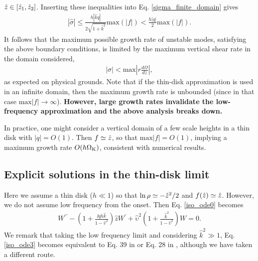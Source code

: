 $\hat{z}\in[\hat{z}_1,\hat{z}_2]$. Inserting these inequalities into
Eq. \ref{sigma_finite_domain} gives
\begin{align}\label{max_growth}
  |\hat{\sigma}|\leq
  \frac{h |\hat{k} q|}{2\sqrt{1+\hat{k}^2}}\mathrm{max}(|f|) < \frac{h |q|}{2}\mathrm{max}(|f|) . 
\end{align}
It
follows that the maximum possible growth rate of unstable modes,
satisfying the above boundary conditions, is limited by the maximum
vertical shear rate in the domain considered,
\begin{align}
  |\sigma| < \mathrm{max} \left|r\frac{d\Omega}{dz}\right|, 
\end{align}
as expected on physical grounds. Note that if the thin-disk
approximation is used in an infinite domain, then the maximum growth
rate is unbounded (since in that case $\mathrm{max}|f|\to\infty$).
{\bf However, large growth rates invalidate the low-frequency
  approximation and the above analysis breaks down.}    


In practice, one might consider a vertical domain of a few scale 
heights in a thin disk with $|q|=O(1)$. Then 
$f\simeq \hat{z}$, so that $\mathrm{max}|f| = O(1)$, implying a
maximum growth rate $O(h \Omega_{\rm K})$, consistent with numerical
results. 

\subsection{Explicit solutions in the thin-disk limit}\label{iso_explicit}
Here we assume a thin disk ($h\ll1$) so that $\ln\rho\simeq
-\hat{z}^2/2$ and $f(\hat{z})\simeq \hat{z}$. However, we do not assume 
low frequency from the onset. Then Eq. \ref{iso_ode0} becomes 
\begin{align}\label{iso_ode3}
  W^{\prime\prime} - \left(1 + \frac{\ii qh \hat{k}}{1-\hat{\upsilon}^2}\right)\hat{z}W^\prime  +
  \hat{\upsilon}^2\left(1+\frac{\hat{k}^2}{1-\hat{\upsilon}^2}\right)W = 0.
\end{align}
We remark that taking the low frequency limit and considering
$\hat{k}^2\gg 1$, Eq. \ref{iso_ode3} becomes equivalent to Eq. 39 in
 or Eq. 28 in , although we have taken a
different route.    
 

